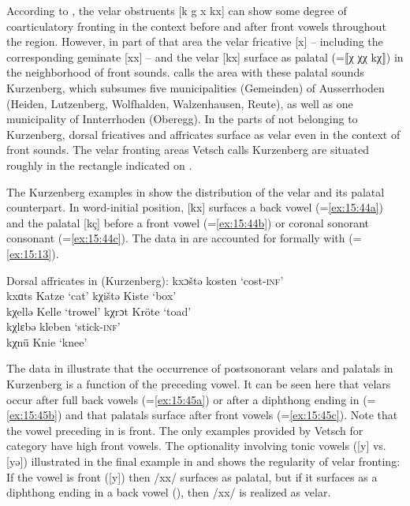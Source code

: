 According to \citet[16]{Vetsch1910}, the velar obstruents [k g x kx] can show some degree of coarticulatory fronting in the context before and after front vowels throughout the  region. However, in part of that area the velar fricative [x] -- including the corresponding geminate [xx] -- and the velar  [kx] surface as palatal (=⟦χ χχ kχ⟧) in the neighborhood of front sounds. \citet[6]{Vetsch1910} calls the area with these palatal sounds Kurzenberg, which subsumes five municipalities (Gemeinden) of  Ausserrhoden (Heiden, Lutzenberg, Wolfhalden, Walzenhausen, Reute), as well as one municipality of  Innterrhoden (Oberegg). In the parts of  not belonging to Kurzenberg, dorsal fricatives and affricates surface as velar even in the context of front sounds. The velar fronting areas Vetsch calls Kurzenberg are situated roughly in the rectangle indicated on .

The Kurzenberg examples in  show the distribution of the velar  and its palatal counterpart. In word-initial position, [kx] surfaces a back vowel (=\ref{ex:15:44a}) and the palatal [kç] before a front vowel (=\ref{ex:15:44b}) or coronal sonorant consonant (=\ref{ex:15:44c}). The data in  are accounted for formally with  (=\ref{ex:15:13}).

\ea%
\label{ex:15:44}Dorsal affricates in  (Kurzenberg):
\ea\label{ex:15:44a} kxɔštə \tab [kxɔʃtə] \tab kosten \tab ‘cost\textsc{{}-inf}’ \\
    kxɑts \tab [kxɑts] \tab Katze \tab ‘cat’ 
\ex\label{ex:15:44b} kχištə \tab [kçiʃtə] \tab Kiste \tab ‘box’ \\
    kχellə \tab [kçellə] \tab Kelle \tab ‘trowel’ 
\ex\label{ex:15:44c} kχrɔt \tab [kçrɔt] \tab Kröte \tab ‘toad’ \\
    kχlɛbə \tab [kçlɛbə] \tab kleben \tab ‘stick-\textsc{inf}’ \\
    kχnǖ \tab [kçnyː] \tab Knie \tab ‘knee’ 
    \z
\z

The data in  illustrate that the occurrence of postsonorant velars and palatals in Kurzenberg is a function of the preceding vowel. It can be seen here that velars occur after full back vowels (=\ref{ex:15:45a}) or after a diphthong ending in  (=\ref{ex:15:45b}) and that palatals surface after front vowels (=\ref{ex:15:45c}). Note that the vowel preceding  in  is front. The only examples provided by Vetsch for category  have high front vowels. The optionality involving tonic vowels ([y] vs. [yə]) illustrated in the final example in  and  shows the regularity of velar fronting: If the vowel is front ([y]) then /xx/ surfaces as palatal, but if it surfaces as a diphthong ending in a back vowel (), then /xx/ is realized as velar.

